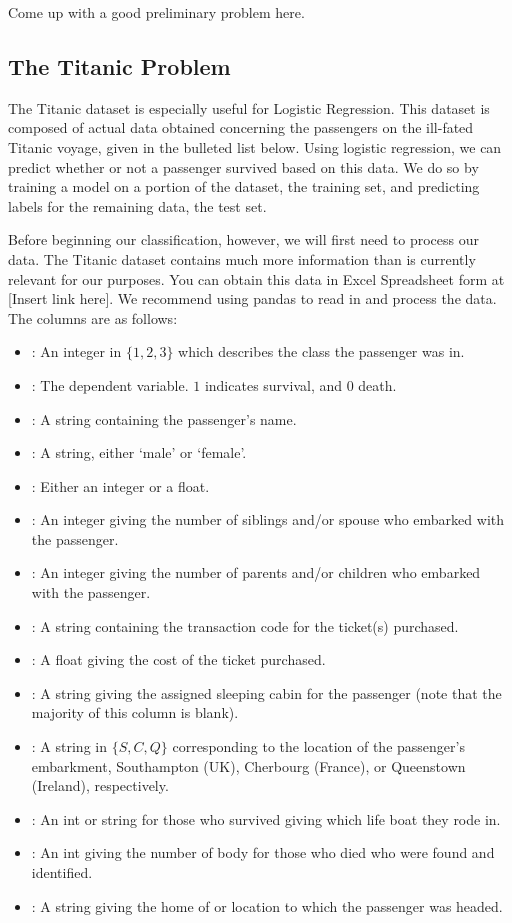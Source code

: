 \begin{problem}
Come up with a good preliminary problem here.
\end{problem}

\subsection*{The Titanic Problem}
The Titanic dataset is especially useful for Logistic Regression.  This dataset is composed of actual data obtained concerning the passengers on the ill-fated Titanic voyage, given in the bulleted list below.  Using logistic regression, we can predict whether or not a passenger survived based on this data.  We do so by training a model on a portion of the dataset, the training set, and predicting labels for the remaining data, the test set.

Before beginning our classification, however, we will first need to process our data.  The Titanic dataset contains much more information than is currently relevant for our purposes.  You can obtain this data in Excel Spreadsheet form at [Insert link here].  We recommend using pandas to read in and process the data.  The columns are as follows:
\begin{itemize}
\item {}: An integer in $\{1, 2, 3\}$ which describes the class the passenger was in.
\item {}:  The dependent variable.  $1$ indicates survival, and $0$ death.
\item {}: A string containing the passenger's name.
\item {}: A string, either `male' or `female'.
\item {}: Either an integer or a float.
\item {}: An integer giving the number of siblings and/or spouse who embarked with the passenger.
\item {}: An integer giving the number of parents and/or children who embarked with the passenger.
\item {}: A string containing the transaction code for the ticket(s) purchased.
\item {}: A float giving the cost of the ticket purchased.
\item {}: A string giving the assigned sleeping cabin for the passenger (note that the majority of this column is blank).
\item {}: A string in $\{S, C, Q\}$ corresponding to the location of the passenger's embarkment, Southampton (UK), Cherbourg (France), or Queenstown (Ireland), respectively.
\item {}: An int or string for those who survived giving which life boat they rode in.
\item {}: An int giving the number of body for those who died who were found and identified.
\item {}: A string giving the home of or location to which the passenger was headed.
\end{itemize}

